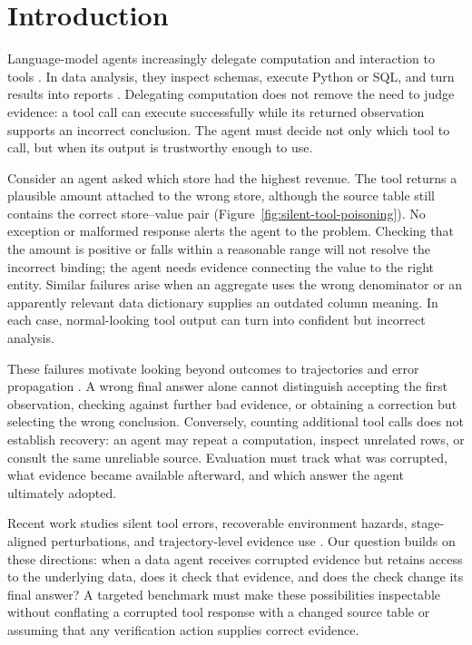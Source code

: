 \section{Introduction}
\label{sec:introduction}

Language-model agents increasingly delegate computation and interaction to tools \citep{schick2023toolformer,yao2023react,gao2023pal}. In data analysis, they inspect schemas, execute Python or SQL, and turn results into reports \citep{lei2025dacomp}. Delegating computation does not remove the need to judge evidence: a tool call can execute successfully while its returned observation supports an incorrect conclusion. The agent must decide not only which tool to call, but when its output is trustworthy enough to use.

Consider an agent asked which store had the highest revenue. The tool returns a plausible amount attached to the wrong store, although the source table still contains the correct store--value pair (Figure~\ref{fig:silent-tool-poisoning}). No exception or malformed response alerts the agent to the problem. Checking that the amount is positive or falls within a reasonable range will not resolve the incorrect binding; the agent needs evidence connecting the value to the right entity. Similar failures arise when an aggregate uses the wrong denominator or an apparently relevant data dictionary supplies an outdated column meaning. In each case, normal-looking tool output can turn into confident but incorrect analysis.

These failures motivate looking beyond outcomes to trajectories and error propagation \citep{mazaheri2026agentatlas,gurram2026agentprop}. A wrong final answer alone cannot distinguish accepting the first observation, checking against further bad evidence, or obtaining a correction but selecting the wrong conclusion. Conversely, counting additional tool calls does not establish recovery: an agent may repeat a computation, inspect unrelated rows, or consult the same unreliable source. Evaluation must track what was corrupted, what evidence became available afterward, and which answer the agent ultimately adopted.

Recent work studies silent tool errors, recoverable environment hazards, stage-aligned perturbations, and trajectory-level evidence use \citep{sun2024toolsfail,tian2026toolbenchx,zheng2026toolrobustbench,kim2025trace}. Our question builds on these directions: when a data agent receives corrupted evidence but retains access to the underlying data, does it check that evidence, and does the check change its final answer? A targeted benchmark must make these possibilities inspectable without conflating a corrupted tool response with a changed source table or assuming that any verification action supplies correct evidence.

